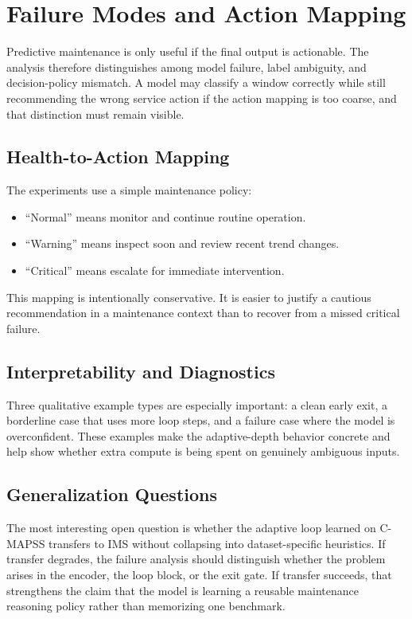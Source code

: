 \section{Failure Modes and Action Mapping}
Predictive maintenance is only useful if the final output is actionable. The analysis therefore distinguishes among model failure, label ambiguity, and decision-policy mismatch. A model may classify a window correctly while still recommending the wrong service action if the action mapping is too coarse, and that distinction must remain visible.

\subsection{Health-to-Action Mapping}
The experiments use a simple maintenance policy:
\begin{itemize}
    \item ``Normal'' means monitor and continue routine operation.
    \item ``Warning'' means inspect soon and review recent trend changes.
    \item ``Critical'' means escalate for immediate intervention.
\end{itemize}
This mapping is intentionally conservative. It is easier to justify a cautious recommendation in a maintenance context than to recover from a missed critical failure.

\subsection{Interpretability and Diagnostics}
Three qualitative example types are especially important: a clean early exit, a borderline case that uses more loop steps, and a failure case where the model is overconfident. These examples make the adaptive-depth behavior concrete and help show whether extra compute is being spent on genuinely ambiguous inputs.

\subsection{Generalization Questions}
The most interesting open question is whether the adaptive loop learned on C-MAPSS transfers to IMS without collapsing into dataset-specific heuristics. If transfer degrades, the failure analysis should distinguish whether the problem arises in the encoder, the loop block, or the exit gate. If transfer succeeds, that strengthens the claim that the model is learning a reusable maintenance reasoning policy rather than memorizing one benchmark.
